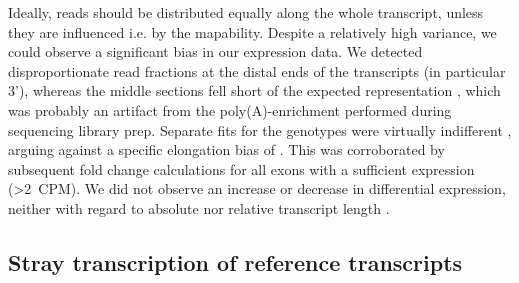 
Ideally, reads should be distributed equally along the whole transcript, unless they are influenced i.e. by the mapability. Despite a relatively high variance, we could observe a significant bias in our expression data. We detected disproportionate read fractions at the distal ends of the transcripts (in particular 3'), whereas the middle sections fell short of the expected representation , which was probably an artifact from the poly(A)-enrichment performed during sequencing library prep. Separate fits for the genotypes were virtually indifferent \dns, arguing against a specific elongation bias of \dnmtchip. This was corroborated by subsequent fold change calculations for all exons with a sufficient expression (\textgreater \SI{2}{CPM}). We did not observe an increase or decrease in differential expression, neither with regard to absolute nor relative transcript length . 

\FloatBarrier
\subsection{Stray transcription of reference transcripts}
\label{chap:r:transcription:strayreference}

